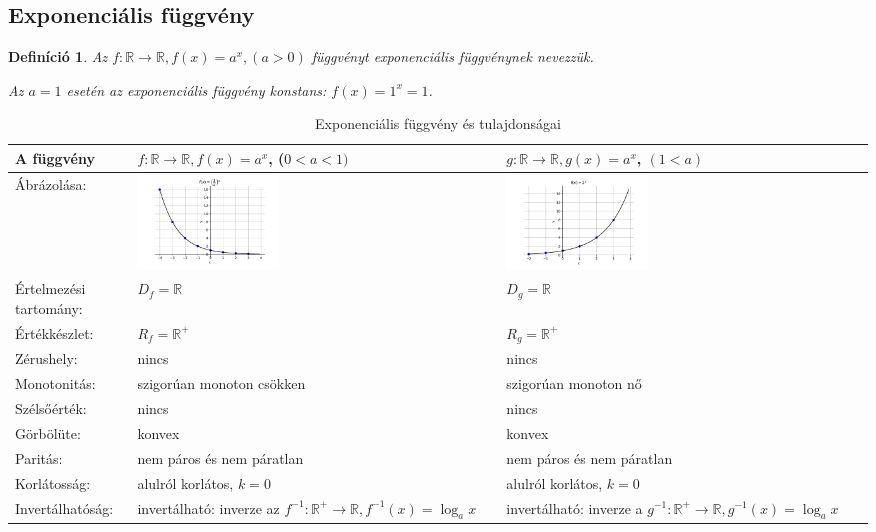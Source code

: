 \documentclass[12pt,a4paper]{article}
\newtheorem{definition}{Definíció} [section]
\begin{document}
\subsection{Exponenciális függvény}
\begin{definition}
Az $f:\mathbb{R}\rightarrow\mathbb{R}, f(x)=a^x, (a>0)$  függvényt exponenciális függvénynek nevezzük.

Az $a=1$ esetén az exponenciális függvény konstans: $f(x)=1^x=1$.
\end{definition}

\begin{table}[h!]
\centering
\begin{tabular}{ | m{3cm} || m{6cm} | m{6cm} | }
A függvény &\centering $f:\mathbb{R}\rightarrow\mathbb{R}, f(x)=a^x$, \newline ($0<a<1)$ & $g:\mathbb{R}\rightarrow\mathbb{R}, g(x)=a^x$, \newline $(1<a)$ \\
\hline
Ábrázolása: &\centering \includegraphics[width=0.4\textwidth]{chart/2021-10-31--11:54:47} & \includegraphics[width=0.4\textwidth]{chart/2021-10-31--11:55:41}\\
\hline
Értelmezési tartomány: & $D_f=\mathbb{R}$ & $D_g=\mathbb{R}$ \\
\hline
Értékkészlet: & $R_f=\mathbb{R}^+$ & $R_g=\mathbb{R}^+$\\
\hline
Zérushely: & nincs & nincs\\
\hline
Monotonitás: &szigorúan monoton csökken&szigorúan monoton nő \\
\hline
Szélsőérték: & nincs & nincs\\
\hline
Görbölüte: & konvex & konvex\\
\hline
Paritás: & nem páros és nem páratlan & nem páros és nem páratlan \\
\hline
Korlátosság: & alulról korlátos, $k=0$ & alulról korlátos, $k=0$ \\
\hline
Invertálhatóság: & invertálható: inverze az $f^{-1}:\mathbb{R}^+\rightarrow\mathbb{R}, f^{-1}(x)=\log_ax$ & invertálható: inverze a $g^{-1}:\mathbb{R}^+\rightarrow\mathbb{R}, g^{-1}(x)=\log_ax$ \\
\end{tabular}
\caption{Exponenciális függvény és tulajdonságai}
\label{table:exp_fugg}
\end{table}
\end{document}
